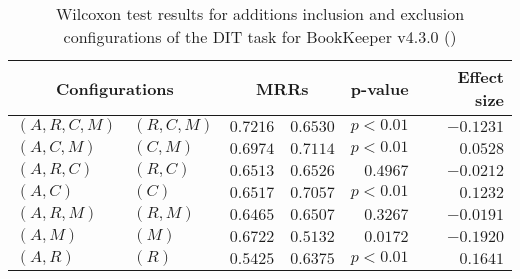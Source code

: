 
\begin{table}
\begin{spacing}{1.2}
\centering
\caption{Wilcoxon test results for additions inclusion and exclusion configurations of the DIT task for BookKeeper v4.3.0 (\ctwo)}
\label{table:versus-wilcox-bookkeeper-dit-additions}
\begin{tabular}{ll|rr|rr}
\toprule
      \multicolumn{2}{c|}{Configurations} &                \multicolumn{2}{c|}{MRRs} &             p-value & Effect size \\
\midrule
 $(A,R,C,M)$ &  $(R,C,M)$ &  $\bm{0.7216}$ &       $0.6530$ & $p<0.01$ &   $-0.1231$ \\
   $(A,C,M)$ &    $(C,M)$ &       $0.6974$ &  $\bm{0.7114}$ & $p<0.01$ &    $0.0528$ \\
   $(A,R,C)$ &    $(R,C)$ &       $0.6513$ &  $\bm{0.6526}$ & $0.4967$ &   $-0.0212$ \\
     $(A,C)$ &      $(C)$ &       $0.6517$ &  $\bm{0.7057}$ & $p<0.01$ &    $0.1232$ \\
   $(A,R,M)$ &    $(R,M)$ &       $0.6465$ &  $\bm{0.6507}$ & $0.3267$ &   $-0.0191$ \\
     $(A,M)$ &      $(M)$ &  $\bm{0.6722}$ &       $0.5132$ & $0.0172$ &   $-0.1920$ \\
     $(A,R)$ &      $(R)$ &       $0.5425$ &  $\bm{0.6375}$ & $p<0.01$ &    $0.1641$ \\
\bottomrule
\end{tabular}

\end{spacing}
\end{table}

